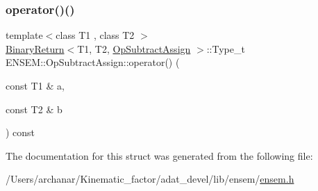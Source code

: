 \mbox{\label{structENSEM_1_1OpSubtractAssign_a8de7df08fa13e2efc8c47c28b8b17887}} 
\subsubsection{\texorpdfstring{operator()()}{operator()()}\hspace{0.1cm}{\footnotesize\ttfamily [2/2]}}
{\footnotesize\ttfamily template$<$class T1 , class T2 $>$ \\
\mbox{\hyperlink{structENSEM_1_1BinaryReturn}{Binary\+Return}}$<$T1, T2, \mbox{\hyperlink{structENSEM_1_1OpSubtractAssign}{Op\+Subtract\+Assign}} $>$\+::Type\+\_\+t E\+N\+S\+E\+M\+::\+Op\+Subtract\+Assign\+::operator() (\begin{DoxyParamCaption}\item[{const T1 \&}]{a,  }\item[{const T2 \&}]{b }\end{DoxyParamCaption}) const\hspace{0.3cm}{\ttfamily [inline]}}



The documentation for this struct was generated from the following file\+:\begin{DoxyCompactItemize}
\item 
/\+Users/archanar/\+Kinematic\+\_\+factor/adat\+\_\+devel/lib/ensem/\mbox{\hyperlink{lib_2ensem_2ensem_8h}{ensem.\+h}}\end{DoxyCompactItemize}
